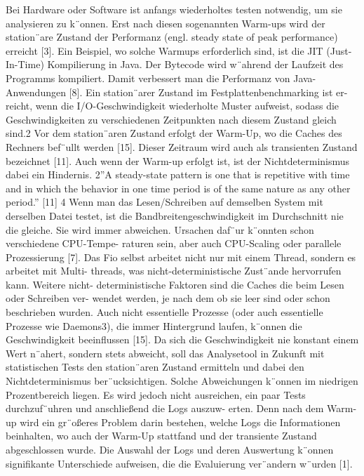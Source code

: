 Bei Hardware oder Software ist anfangs wiederholtes testen notwendig, um
sie analysieren zu k¨onnen. Erst nach diesen sogenannten Warm-ups wird der
station¨are Zustand der Performanz (engl. steady state of peak performance)
erreicht [3]. Ein Beispiel, wo solche Warmups erforderlich sind, ist die JIT
(Just-In-Time) Kompilierung in Java. Der Bytecode wird w¨ahrend der Laufzeit
des Programms kompiliert. Damit verbessert man die Performanz von Java-
Anwendungen [8]. Ein station¨arer Zustand im Festplattenbenchmarking ist er-
reicht, wenn die I/O-Geschwindigkeit wiederholte Muster aufweist, sodass die
Geschwindigkeiten zu verschiedenen Zeitpunkten nach diesem Zustand gleich
sind.2 Vor dem station¨aren Zustand erfolgt der Warm-Up, wo die Caches des
Rechners bef¨ullt werden [15]. Dieser Zeitraum wird auch als transienten Zustand
bezeichnet [11]. Auch wenn der Warm-up erfolgt ist, ist der Nichtdeterminismus
dabei ein Hindernis.
2”A steady-state pattern is one that is repetitive with time and in which the behavior in
one time period is of the same nature as any other period.” [11]
4
Wenn man das Lesen/Schreiben auf demselben System mit derselben Datei
testet, ist die Bandbreitengeschwindigkeit im Durchschnitt nie die gleiche. Sie
wird immer abweichen. Ursachen daf¨ur k¨onnten schon verschiedene CPU-Tempe-
raturen sein, aber auch CPU-Scaling oder parallele Prozessierung [7]. Das Fio
selbst arbeitet nicht nur mit einem Thread, sondern es arbeitet mit Multi-
threads, was nicht-deterministische Zust¨ande hervorrufen kann. Weitere nicht-
deterministische Faktoren sind die Caches die beim Lesen oder Schreiben ver-
wendet werden, je nach dem ob sie leer sind oder schon beschrieben wurden.
Auch nicht essentielle Prozesse (oder auch essentielle Prozesse wie Daemons3),
die immer Hintergrund laufen, k¨onnen die Geschwindigkeit beeinflussen [15].
Da sich die Geschwindigkeit nie konstant einem Wert n¨ahert, sondern stets
abweicht, soll das Analysetool in Zukunft mit statistischen Tests den station¨aren
Zustand ermitteln und dabei den Nichtdeterminismus ber¨ucksichtigen. Solche
Abweichungen k¨onnen im niedrigen Prozentbereich liegen. Es wird jedoch nicht
ausreichen, ein paar Tests durchzuf¨uhren und anschließend die Logs auszuw-
erten. Denn nach dem Warm-up wird ein gr¨oßeres Problem darin bestehen,
welche Logs die Informationen beinhalten, wo auch der Warm-Up stattfand und
der transiente Zustand abgeschlossen wurde. Die Auswahl der Logs und deren
Auswertung k¨onnen signifikante Unterschiede aufweisen, die die Evaluierung
ver¨andern w¨urden [1].

